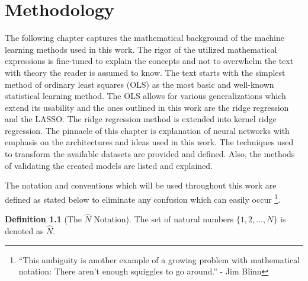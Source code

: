 \documentclass[11pt,oneside,czech,american]{book} %
\theoremstyle{plain}
\theoremstyle{definition}
\newtheorem{defn}{Definition}
\begin{document}
\chapter{Methodology}
\pagestyle{headings}
The following chapter captures the mathematical background of the machine learning methods used in this work. The rigor of the utilized mathematical expressions is fine-tuned to explain the concepts and not to overwhelm the text with theory the reader is assumed to know. The text starts with the simplest method of ordinary least squares (OLS) as the most basic and well-known statistical learning method. The OLS allows for various generalizations which extend its usability and the ones outlined in this work are the ridge regression and the LASSO. The ridge regression method is extended into kernel ridge regression. The pinnacle of this chapter is explanation of neural networks with emphasis on the architectures and ideas used in this work. The techniques used to transform the available datasets are provided and defined. Also, the methods of validating the created models are listed and explained.

The notation and conventions which will be used throughout this work are defined as stated below to eliminate any confusion which can easily occur \footnote{“This ambiguity is another example of a growing problem with mathematical notation: There aren't enough squiggles to go around.” - Jim Blinn}.

\begin{defn}[{The $\hat{N}$ Notation}]
	The set of natural numbers $\{1, 2, \dots, N\}$ is denoted as $\hat{N}$.
\end{defn}
\end{document}
